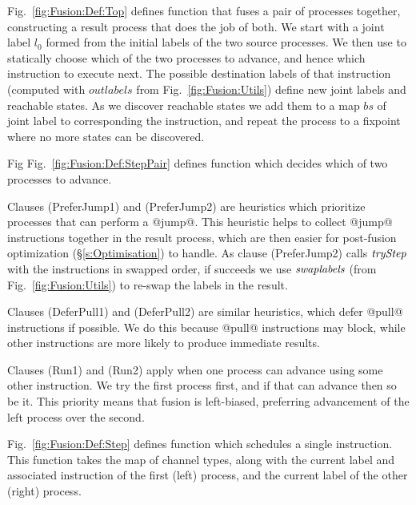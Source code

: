 



\smallskip
Fig.~\ref{fig:Fusion:Def:Top} defines function  that fuses a pair of processes together, constructing a result process that does the job of both. We start with a joint label $l_0$ formed from the initial labels of the two source processes. We then use  to statically choose which of the two processes to advance, and hence which instruction to execute next. The possible destination labels of that instruction (computed with $outlabels$ from Fig.~\ref{fig:Fusion:Utils}) define new joint labels and reachable states. As we discover reachable states we add them to a map $bs$ of joint label to corresponding the instruction, and repeat the process to a fixpoint where no more states can be discovered.



\eject{}
Fig Fig.~\ref{fig:Fusion:Def:StepPair} defines function  which decides which of two processes to advance.

Clauses (PreferJump1) and (PreferJump2) are heuristics which prioritize processes that can perform a @jump@. This heuristic helps to collect @jump@ instructions together in the result process, which are then easier for post-fusion optimization (\S\ref{s:Optimisation}) to handle. As clause (PreferJump2) calls $\textit{tryStep}$ with the instructions in swapped order, if  succeeds we use $\textit{swaplabels}$ (from Fig.~\ref{fig:Fusion:Utils}) to re-swap the labels in the result.

Clauses (DeferPull1) and (DeferPull2) are similar heuristics, which defer @pull@ instructions if possible. We do this because @pull@ instructions may block, while other instructions are more likely to produce immediate results.

Clauses (Run1) and (Run2) apply when one process can advance using some other instruction. We try the first process first, and if that can advance then so be it. This priority means that fusion is left-biased, preferring advancement of the left process over the second.




\smallskip
Fig.~\ref{fig:Fusion:Def:Step} defines function  which schedules a single instruction. This function takes the map of channel types, along with the current label and associated instruction of the first (left) process, and the current label of the other (right) process.

